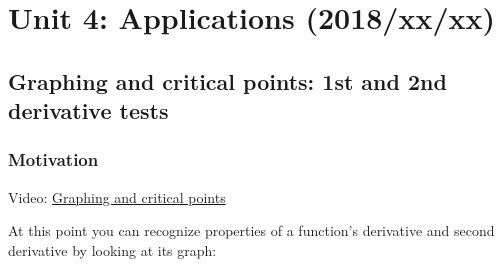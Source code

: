 \documentclass[pdftex, brazil, 12pt, twoside]{article}
\begin{document}
\newpage
\section{Unit 4: Applications (2018/xx/xx)}
\label{u4}


\subsection{Graphing and critical points: 1st and 2nd derivative tests}
\label{u4-graphing-1st-2st}

\subsubsection{Motivation}
\label{u4-graphing-1st-2st-motiv}

Video: \href{https://www.youtube.com/watch?v=XbbsSxWq9Ws}{Graphing and critical points}

At this point you can recognize properties
of a function's derivative and second derivative
by looking at its graph:

\begin{figure}[H]
  \begin{center}
  \end{center}
\end{figure}
\end{document}
